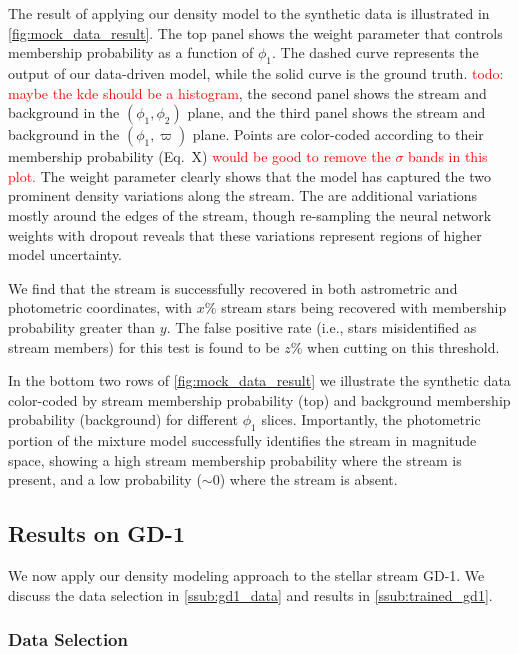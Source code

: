 \documentclass[twocolumn]{aastex631}
\newcommand{\TODO}[1]{{\textcolor{red}{#1}}}
\newcommand{\JN}[1]{\TODO{#1}}
\begin{document}
        The result of applying our density model to the synthetic data is illustrated in \autoref{fig:mock_data_result}. The top panel shows the weight parameter that controls membership probability as a function of $\phi_1$. The dashed curve represents the output of our data-driven model, while the solid curve is the ground truth. \JN{todo: maybe the kde should be a histogram}, the second panel shows the stream and background in the $(\phi_1,\phi_2)$ plane, and the third panel shows the stream and background in the $(\phi_1,\varpi)$ plane. Points are color-coded according to their membership probability (Eq.~X) \JN{would be good to remove the $\sigma$ bands in this plot.} The weight parameter clearly shows that the model has captured the two prominent density variations along the stream. The are additional variations  mostly around the edges of the stream, though re-sampling the neural network weights with dropout reveals that these variations represent regions of higher model uncertainty. 
        
        We find that the stream is successfully recovered in both astrometric and photometric coordinates, with $x\%$ stream stars being recovered with membership probability greater than $y$. The false positive rate (i.e., stars misidentified as stream members) for this test is found to be $z\%$ when cutting on this threshold. 
    
        In the bottom two rows of \autoref{fig:mock_data_result} we illustrate the synthetic data color-coded by stream membership probability (top) and background membership probability (background) for different $\phi_1$ slices. Importantly, the photometric portion of the mixture model successfully identifies the stream in magnitude space, showing a high stream membership probability where the stream is present, and a low probability ($\sim 0$) where the stream is absent.  
    
    
    \subsection{Results on GD-1} \label{sub:gd1}

        We now apply our density modeling approach to the stellar stream GD-1. We discuss the data selection in \autoref{ssub:gd1_data} and results in \autoref{ssub:trained_gd1}.
        
        \subsubsection{Data Selection} \label{ssub:gd1_data}
\end{document}
